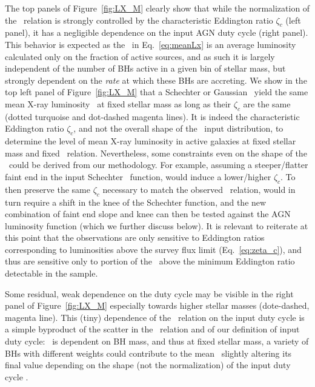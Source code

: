 The top panels of Figure~\ref{fig:LX_M} clearly show that while the normalization of the \LXMS\ relation is strongly controlled by the characteristic Eddington ratio $\zeta_c$ (left panel), it has a negligible dependence on the input AGN duty cycle (right panel). This behavior is expected as the \LX\ in Eq.~\ref{eq:meanLx} is an average luminosity calculated only on the fraction of active sources, and as such it is largely independent of the number of BHs active in a given bin of stellar mass, but strongly dependent on the {\emph{rate}} at which these BHs are accreting. We show in the top left panel of Figure~\ref{fig:LX_M} that a Schechter or Gaussian \PLz\ yield the same mean X-ray luminosity \LX\ at fixed stellar mass as long as their $\zeta_c$ are the same (dotted turquoise and dot-dashed magenta lines). It is indeed the characteristic Eddington ratio $\zeta_c$, and not the overall shape of the \PLz\ input distribution, to determine the level of mean X-ray luminosity in active galaxies at fixed stellar mass and
fixed \MBHMS\ relation. Nevertheless, some constraints even on the shape of the \PLz\ could be derived from our methodology. For example, assuming a steeper/flatter faint end in the input Schechter \PLz\ function, would induce a lower/higher $\zeta_c$. To then preserve the same $\zeta_c$ necessary to match the observed \LXMS\ relation, would in turn require a shift in the knee of the Schechter function, and the new combination of faint end slope and knee can then be tested against the AGN luminosity function (which we further discuss below). It is relevant to reiterate at this point that the observations are only sensitive to Eddington ratios corresponding to luminosities above the survey flux limit (Eq.~\ref{eq:zeta_c}), and thus are sensitive only to portion of the \PLz\ above the minimum Eddington ratio detectable in the sample.

Some residual, weak dependence on the duty cycle may be visible in the right panel of Figure~\ref{fig:LX_M} especially towards higher stellar masses (dote-dashed, magenta line). This (tiny) dependence of the \LXMS\ relation on the input duty cycle is a simple byproduct of the scatter in the \MBHMS\ relation and of our definition of input duty cycle: \UMBHz\ is dependent on BH mass, and thus at fixed stellar mass, a variety of BHs with different weights could contribute to the mean \LX\, slightly altering its final value depending on the shape (not the normalization) of the input duty cycle \UMBHz{}.


